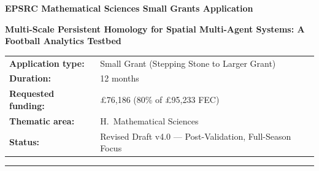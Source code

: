 \documentclass[11pt,a4paper]{article}
\begin{document}
\begin{center}
  {\Large\bfseries EPSRC Mathematical Sciences Small Grants Application\par}
  \vspace{0.75em}
  {\large\bfseries Multi-Scale Persistent Homology for Spatial Multi-Agent Systems: A Football Analytics Testbed\par}
  \vspace{1em}
  \begin{tabular}{@{}ll@{}}
    \textbf{Application type:} & Small Grant (Stepping Stone to Larger Grant) \\
    \textbf{Duration:} & 12 months \\
    \textbf{Requested funding:} & \pounds76{,}186 (80\% of \pounds95{,}233 FEC) \\
    \textbf{Thematic area:} & H.\ Mathematical Sciences \\
    \textbf{Status:} & Revised Draft v4.0 --- Post-Validation, Full-Season Focus \\
  \end{tabular}
\end{center}

\vspace{1.5em}
\hrule
\vspace{1.25em}










\end{document}
